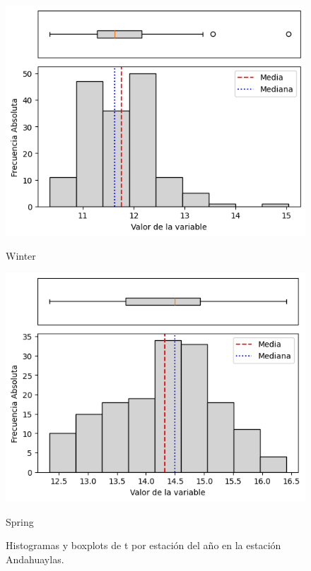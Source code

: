\begin{figure}[htbp]
\begin{minipage}{0.30\textwidth}
  \includegraphics[width=\linewidth]{resultados/por_estacion_del_anio/boxplot_clases_por_estacion/Andahuaylas/T_HistBoxplot_Winter.png}
  \caption*{Winter}
\end{minipage}
\hfill
\begin{minipage}{0.30\textwidth}
  \includegraphics[width=\linewidth]{resultados/por_estacion_del_anio/boxplot_clases_por_estacion/Andahuaylas/T_HistBoxplot_Spring.png}
  \caption*{Spring}
\end{minipage}
\caption{Histogramas y boxplots de \gls{t}  por estación del año en la estación Andahuaylas.}
\label{fig:andahuaylas_t_hist}
\end{figure}

